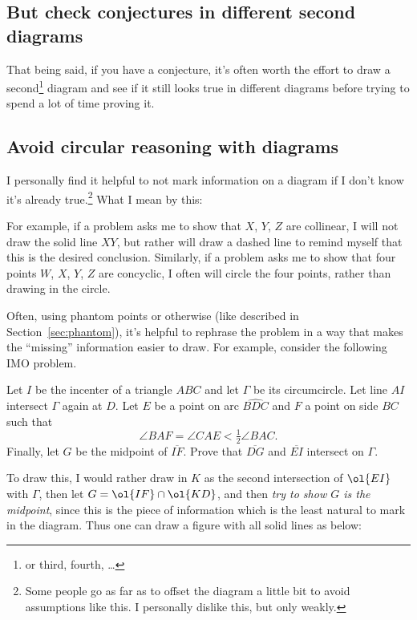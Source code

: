 \documentclass[11pt]{scrartcl}
\begin{document}
\subsection{But check conjectures in different second diagrams}
That being said, if you have a conjecture, it's often worth the effort to
draw a second\footnote{or third, fourth, \dots} diagram and
\alert{see if it still looks true in different diagrams
before trying to spend a lot of time proving it}.

\subsection{Avoid circular reasoning with diagrams}
I personally find it helpful to not mark information on a diagram
if I don't know it's already true.\footnote{Some
  people go as far as to offset the diagram a little bit to
  avoid assumptions like this.
  I personally dislike this, but only weakly.}
What I mean by this:
\begin{itemize}
  \ii For example, if a problem asks me to show
  that $X$, $Y$, $Z$ are collinear,
  I will not draw the solid line $XY$,
  but rather will draw a dashed line to remind myself
  that this is the desired conclusion.
  \ii Similarly, if a problem asks me to show that four points
  $W$, $X$, $Y$, $Z$ are concyclic,
  I often will circle the four points, rather than drawing in the circle.
\end{itemize}
Often, using phantom points or otherwise
(like described in Section~\ref{sec:phantom}),
it's helpful to rephrase the problem in a way that makes
the ``missing'' information easier to draw.
For example, consider the following IMO problem.
\begin{example}
[IMO 2010]
Let $I$ be the incenter of a triangle $ABC$ and let $\Gamma$ be its circumcircle.
Let line $AI$ intersect $\Gamma$ again at $D$.
Let $E$ be a point on arc $\widehat{BDC}$ and $F$ a point on side $BC$ such that
\[ \angle BAF = \angle CAE < \tfrac12 \angle BAC. \]
Finally, let $G$ be the midpoint of $\overline{IF}$.
Prove that $\overline{DG}$ and $\overline{EI}$ intersect on $\Gamma$.
\end{example}
To draw this, I would rather draw in $K$ as the second intersection
of $\ol{EI}$ with $\Gamma$, then let $G = \ol{IF} \cap \ol{KD}$,
and then \emph{try to show $G$ is the midpoint},
since this is the piece of information which is the least
natural to mark in the diagram.
Thus one can draw a figure with all solid lines as below:
\end{document}
